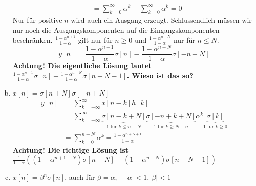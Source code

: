\begin{enumerate}[a)]
\begin{align*}
						&= \sum_{k=0}^{\infty}\alpha^k - \sum_{k=0}^{\infty}\alpha^k = 0
			\end{align*}
			Nur für positive $n$ wird auch ein Ausgang erzeugt. Schlussendlich müssen wir nur noch die  Ausgangskomponenten auf die Eingangskomponenten beschränken. $\frac{1-\alpha ^{n+1}}{1-\alpha} $ gilt nur für $n\ge 0$ und $\frac{1-\alpha^{n-N}}{1-\alpha}$ nur für $n\le N$.
			\[
				y[n]	= \frac{1-\alpha ^{n+1}}{1-\alpha}\sigma[n]-\frac{1-\alpha^{n-N}}{1-\alpha}\sigma[-n+N]
			\]
			\textbf{Achtung! Die eigentliche Lösung lautet $\frac{1-\alpha ^{n+1}}{1-\alpha}\sigma[n]-\frac{1-\alpha^{n-N}}{1-\alpha}\sigma[n-N-1]$. Wieso ist das so?}
		\item $x[n]=\sigma [n+N]\sigma [-n+N]$
			\begin{align*}
				y[n]	&= \sum_{k=-\infty}^{\infty}x[n-k]h[k] \\
						&= \sum_{k=-\infty}^{\infty}\underbrace{\sigma[n-k+N]}_{1 \text{ für } k\le n+N}\underbrace{\sigma[-n+k+N]}_{1 \text{ für } k\ge N-n} \alpha^{k}\underbrace{\sigma[k]}_{1 \text{ für } k\ge 0} \\
						&= \sum_{k=0}^{n+N} \alpha^{k} = \frac{1-\alpha^{n+N+1}}{1-\alpha}
			\end{align*}
			\textbf{Achtung! Die richtige Lösung ist\\ $\frac{1}{1-\alpha}((1-\alpha^{n+1+N})\sigma[n+N]-(1-\alpha^{n-N})\sigma[n-N-1])$}
		\item $x[n]=\beta ^n \sigma [n]$, auch für $\beta = \alpha, \quad |\alpha|<1, |\beta| < 1$
	\end{enumerate}